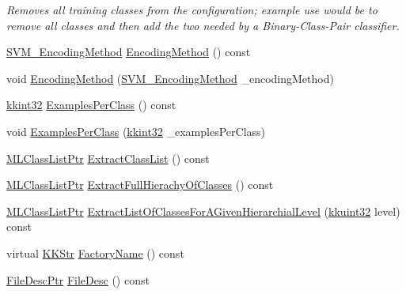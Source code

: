 \begin{DoxyCompactItemize}
\begin{DoxyCompactList}\small\item\em Removes all training classes from the configuration; example use would be to remove all classes and then add the two needed by a Binary-\/\+Class-\/\+Pair classifier. \end{DoxyCompactList}\item 
\hyperlink{namespace_k_k_m_l_l_a1994af1d94ca5bf6e27f0cf803a8d64c}{S\+V\+M\+\_\+\+Encoding\+Method} \hyperlink{class_k_k_m_l_l_1_1_training_configuration2_a428e8ffb42098847e9c9959db718923d}{Encoding\+Method} () const 
\item 
void \hyperlink{class_k_k_m_l_l_1_1_training_configuration2_aaddd00b39ecccdde17d0a75f63e353a5}{Encoding\+Method} (\hyperlink{namespace_k_k_m_l_l_a1994af1d94ca5bf6e27f0cf803a8d64c}{S\+V\+M\+\_\+\+Encoding\+Method} \+\_\+encoding\+Method)
\item 
\hyperlink{namespace_k_k_b_a8fa4952cc84fda1de4bec1fbdd8d5b1b}{kkint32} \hyperlink{class_k_k_m_l_l_1_1_training_configuration2_a0fd5f237bd46a228c710369aacc84632}{Examples\+Per\+Class} () const 
\item 
void \hyperlink{class_k_k_m_l_l_1_1_training_configuration2_a7b59475c2f5456d6412a503ff3d4dcd2}{Examples\+Per\+Class} (\hyperlink{namespace_k_k_b_a8fa4952cc84fda1de4bec1fbdd8d5b1b}{kkint32} \+\_\+examples\+Per\+Class)
\item 
\hyperlink{namespace_k_k_m_l_l_af091cde3f4a4315658b41a5e7583fc26}{M\+L\+Class\+List\+Ptr} \hyperlink{class_k_k_m_l_l_1_1_training_configuration2_a8fa24b8e0fd158131536ddeac9cc1da1}{Extract\+Class\+List} () const 
\item 
\hyperlink{namespace_k_k_m_l_l_af091cde3f4a4315658b41a5e7583fc26}{M\+L\+Class\+List\+Ptr} \hyperlink{class_k_k_m_l_l_1_1_training_configuration2_ad52f23fe7b32835013c19d0a0fb2dcb0}{Extract\+Full\+Hierachy\+Of\+Classes} () const 
\item 
\hyperlink{namespace_k_k_m_l_l_af091cde3f4a4315658b41a5e7583fc26}{M\+L\+Class\+List\+Ptr} \hyperlink{class_k_k_m_l_l_1_1_training_configuration2_a603b0a9dfe8a6a6215b41c4de7e8faa4}{Extract\+List\+Of\+Classes\+For\+A\+Given\+Hierarchial\+Level} (\hyperlink{namespace_k_k_b_af8d832f05c54994a1cce25bd5743e19a}{kkuint32} level) const 
\item 
virtual \hyperlink{class_k_k_b_1_1_k_k_str}{K\+K\+Str} \hyperlink{class_k_k_m_l_l_1_1_training_configuration2_ad9e5ab5a169d97ec6d7212f9a373be1a}{Factory\+Name} () const 
\item 
\hyperlink{namespace_k_k_m_l_l_aa0d0b6ab4ec18868a399b8455b05d914}{File\+Desc\+Ptr} \hyperlink{class_k_k_m_l_l_1_1_training_configuration2_a10aa25a301d7be09721c0566e2f1a3d9}{File\+Desc} () const 

\end{DoxyCompactItemize}
